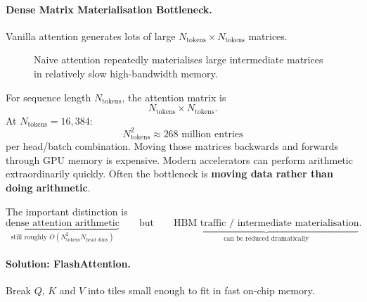 \paragraph{Dense Matrix Materialisation Bottleneck.}
Vanilla attention generates lots of large $N_{\text{tokens}}\times N_{\text{tokens}}$ matrices.
\begin{figure}[htbp]
\centering
{}
\caption{Naive attention repeatedly materialises large intermediate matrices in relatively slow high-bandwidth memory.}
\label{fig:modern-naive-attention-io}
\end{figure}

For sequence length $N_{\text{tokens}}$, the attention matrix is
\[
N_{\text{tokens}}\times N_{\text{tokens}}.
\]
At $N_{\text{tokens}}=16{,}384$:
\[
N_{\text{tokens}}^2
\approx
268\text{ million entries}
\]
per head/batch combination.
Moving those matrices backwards and forwards through GPU memory is expensive.
Modern accelerators can perform arithmetic extraordinarily quickly.
Often the bottleneck is \textbf{moving data rather than doing arithmetic}.

The important distinction is
\[
\underbrace{\text{dense attention arithmetic}}_{\text{still roughly }O(N_{\text{tokens}}^2N_{\text{head dims}})}
\qquad\text{but}\qquad
\underbrace{\text{HBM traffic / intermediate materialisation}}_{\text{can be reduced dramatically}}.
\]

\paragraph{Solution: FlashAttention.}
Break $Q$, $K$ and $V$ into tiles small enough to fit in fast on-chip memory.

